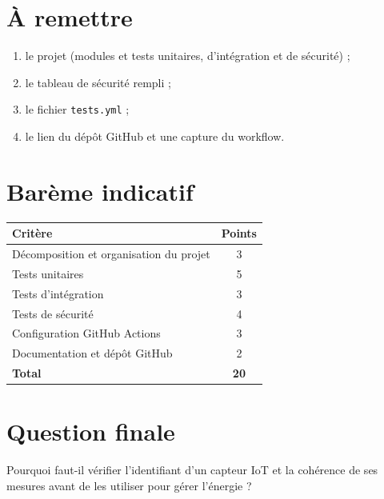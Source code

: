 \documentclass[11pt,a4paper]{article}
\begin{document}
\section{À remettre}

\begin{enumerate}
    \item le projet (modules et tests unitaires, d'intégration et de sécurité) ;
    \item le tableau de sécurité rempli ;
    \item le fichier \texttt{tests.yml} ;
    \item le lien du dépôt GitHub et une capture du workflow.
\end{enumerate}

\section{Barème indicatif}

\begin{center}
\begin{tabular}{|p{10cm}|c|}
\hline
\textbf{Critère} & \textbf{Points}\\
\hline
Décomposition et organisation du projet & 3\\
Tests unitaires & 5\\
Tests d'intégration & 3\\
Tests de sécurité & 4\\
Configuration GitHub Actions & 3\\
Documentation et dépôt GitHub & 2\\
\hline
\textbf{Total} & \textbf{20}\\
\hline
\end{tabular}
\end{center}

\section{Question finale}

Pourquoi faut-il vérifier l'identifiant d'un capteur IoT et la cohérence de ses mesures
avant de les utiliser pour gérer l'énergie ?
\end{document}
